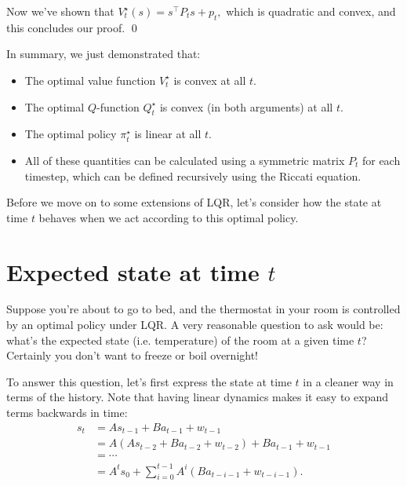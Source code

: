 \documentclass[../main/main]{subfiles}
\begin{document}
Now we've shown that $V^\star_t(s) = s^\top P_t s + p_t,$ which is quadratic and convex, and this concludes our proof. \qed

In summary, we just demonstrated that:

\begin{itemize}
    \item The optimal value function $V^\star_t$ is convex at all $t$.
    \item The optimal $Q$-function $Q^\star_t$ is convex (in both arguments) at all $t$.
    \item The optimal policy $\pi^\star_t$ is linear at all $t$.
    \item All of these quantities can be calculated using a symmetric matrix $P_t$ for each timestep, which can be defined recursively using the Riccati equation.
\end{itemize}

Before we move on to some extensions of LQR, let's consider how the state at time $t$ behaves when we act according to this optimal policy.

\section{Expected state at time $t$}


Suppose you're about to go to bed, and the thermostat in your room is controlled by an optimal policy under LQR. A very reasonable question to ask would be: what's the expected state (i.e. temperature) of the room at a given time $t$? Certainly you don't want to freeze or boil overnight!

To answer this question, let's first express the state at time $t$ in a cleaner way in terms of the history. Note that having linear dynamics makes it easy to expand terms backwards in time:
\begin{align*}
    s_t &= A s_{t-1} + B a_{t-1} + w_{t-1} \\
    &= A (As_{t-2} + B a_{t-2} + w_{t-2}) + B a_{t-1} + w_{t-1} \\
    &= \cdots \\
    &= A^t s_0 + \sum_{i=0}^{t-1} A^i (B a_{t-i-1} + w_{t-i-1}).
\end{align*}
\end{document}
